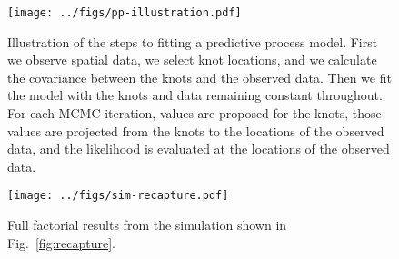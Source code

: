 \documentclass[12pt,english]{article}
\begin{document}
\begin{figure}[htb]
  \begin{center}
    \texttt{[image: ../figs/pp-illustration.pdf]}
    \caption{
      Illustration of the steps to fitting a predictive process model.
      First we observe spatial data, we select knot locations,
      and we calculate the covariance between the knots and the observed data.
      Then we fit the model with the knots and data remaining constant throughout.
      For each MCMC iteration, values are proposed for the
      knots, those values are projected from the knots to the locations of the observed data,
      and the likelihood is evaluated at the locations of the observed data.}
    \label{fig:didactic}
  \end{center}
\end{figure}

\clearpage

\begin{figure}[htb]
  \begin{center}
    \texttt{[image: ../figs/sim-recapture.pdf]}
    \caption{
      Full factorial results from the simulation shown in Fig.~\ref{fig:recapture}.
    }
    \label{fig:recapture-factorial}
  \end{center}
\end{figure}

\renewcommand\theadfont{\scriptsize}
\renewcommand\theadalign{cl}
\end{document}
